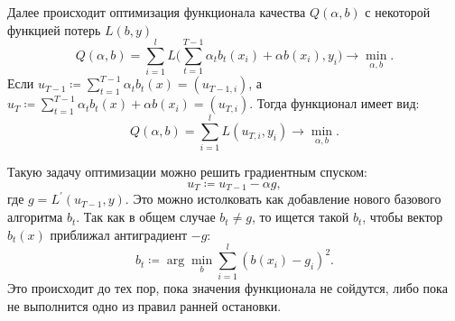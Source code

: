 Далее происходит оптимизация функционала качества $Q(\alpha, b)$ с некоторой функцией потерь $L(b,y)$
\[
	Q(\alpha, b) = \sum_{i=1}^lL\big(\sum_{t=1}^{T-1} \alpha_t b_t(x_i) + \alpha b(x_i), y_i\big) \to \min\limits_{\alpha, b}.
\]
Если $u_{T-1} \coloneqq \sum\limits_{t=1}^{T-1} \alpha_t b_t(x) = (u_{T-1, i})$, а $u_{T} \coloneqq \sum\limits_{t=1}^{T-1} \alpha_t b_t(x) + \alpha b(x_i) = (u_{T, i})$. Тогда функционал имеет вид:
\[
	Q(\alpha, b) = \sum_{i=1}^l L(u_{T, i}, y_i) \to \min\limits_{\alpha, b}.
\]

Такую задачу оптимизации можно решить градиентным спуском: 
\[{u_T \coloneqq u_{T-1} - \alpha g,}\] 
где ${g = L^{'}(u_{T-1}, y)}$. Это можно истолковать как добавление нового базового алгоритма $b_t$. Так как в общем случае $b_t \neq g$, то ищется такой $b_t$, чтобы вектор $b_t(x)$ приближал антиградиент $-g$:
\[
	b_t \coloneqq \arg \min\limits_{b} \sum_{i=1}^l (b(x_i) - g_i)^2.
\]
Это происходит до тех пор, пока значения функционала не сойдутся, либо пока не выполнится одно из правил ранней остановки.
\iffalse
Градиентный бустинг — это метод машинного обучения, посвященный решению для задач классификации и регрессии, которая строит модель предсказания в форме ансамбля слабых предсказывающих моделей, обычно деревьев решений. Обучение
ансамбля проводится последовательно в отличие, например от бэггинга. На
каждой итерации вычисляются отклонения предсказаний уже обученного ансамбля на обучающей выборке. Следующая модель, которая будет добавлена в ансамбль будет предсказывать эти отклонения. Таким образом, добавив
предсказания нового дерева к предсказаниям обученного ансамбля мы можем
уменьшить среднее отклонение модели, которое является таргетом оптимизационной задачи. Новые деревья добавляются в ансамбль до тех пор, пока ошибка
уменьшается, либо пока не выполняется одно из правил ранней остановки.
\fi